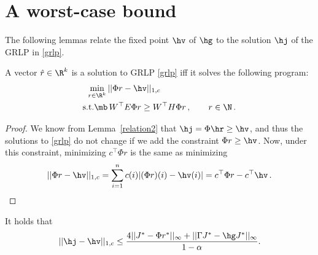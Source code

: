 \section{A worst-case bound}
The following lemmas relate the fixed point $\hv$ of $\hg$ to the solution $\hj$ of the GRLP in \eqref{grlp}.
\begin{lemma}\label{srw}
A vector
$\hat{r} \in \R^k$ is a solution to GRLP \eqref{grlp} iff it solves the following program:
\begin{align}\label{grlpeqprog}
\begin{split}
\min_{r\in \R^k}\, &||\Phi r-\hv||_{1,c}\\
\text{s.t.}\mb &\, W^\top E \Phi r\geq W^\top H \Phi r\,, \qquad r\in \N\,.
\end{split}
\end{align}
\end{lemma}
\begin{proof}
We know from Lemma~\ref{relation2} that $\hj = \Phi \hr \geq\hv$, and thus
the solutions to \eqref{grlp} do not change if we add the constraint $\Phi r \ge \hv$.
Now, under this constraint, minimizing $c^\top \Phi r$ is the same as
 minimizing 
\begin{align*}
||\Phi r-\hv||_{1,c}=\sum_{i=1}^n c(i) |(\Phi r)(i)-\hv(i)|=c^\top \Phi r-c^\top \hv\,.
\end{align*} 
\end{proof}
\begin{theorem}\label{mt2}
It holds that
\begin{align}
||\hj-\hv||_{1,c}\leq\frac{4||J^*-\Phi r^*||_\infty+||\Gamma J^*-\hg J^*||_\infty}{1-\alpha}.
\end{align}
\end{theorem}

